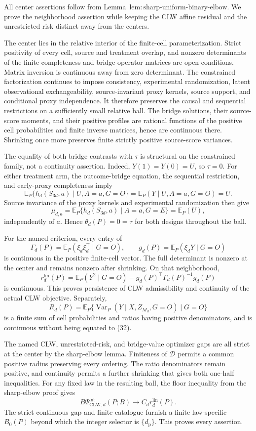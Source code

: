 All center assertions follow from Lemma~\(\mathrm{lem{:}sharp\text{-}uniform\text{-}binary\text{-}elbow}\). We prove the neighborhood assertion while keeping the CLW affine residual and the unrestricted risk distinct away from the centers.

The center lies in the relative interior of the finite-cell parameterization. Strict positivity of every cell, source and treatment overlap, and nonzero determinants of the finite completeness and bridge-operator matrices are open conditions. Matrix inversion is continuous away from zero determinant. The constrained factorization continues to impose consistency, experimental randomization, latent observational exchangeability, source-invariant proxy kernels, source support, and conditional proxy independence. It therefore preserves the causal and sequential restrictions on a sufficiently small relative ball. The bridge solutions, their source-score moments, and their positive profiles are rational functions of the positive cell probabilities and finite inverse matrices, hence are continuous there. Shrinking once more preserves finite strictly positive source-score variances.

The equality of both bridge contrasts with \(\tau\) is structural on the constrained family, not a continuity assertion. Indeed, \(Y(1)=Y(0)=U\), so \(\tau=0\). For either treatment arm, the outcome-bridge equation, the sequential restriction, and early-proxy completeness imply
\[
 \mathbb E_P\{h_d(S_{3d},a)\mid U,A=a,G=O\}
 =\mathbb E_P(Y\mid U,A=a,G=O)=U.
\]
Source invariance of the proxy kernels and experimental randomization then give
\[
 \mu_{d,a}
 =\mathbb E_P\{h_d(S_{3d},a)\mid A=a,G=E\}
 =\mathbb E_P(U),
\]
independently of \(a\). Hence \(\theta_d(P)=0=\tau\) for both designs throughout the ball.

For the named criterion, every entry of
\[
 \Gamma_d(P)=\mathbb E_P(\xi_d\xi_d^\top\mid G=O),
 \qquad g_d(P)=\mathbb E_P(\xi_dY\mid G=O)
\]
is continuous in the positive finite-cell vector. The full determinant is nonzero at the center and remains nonzero after shrinking. On that neighborhood,
\[
 r_d^{\mathrm{lin}}(P)
 =\mathbb E_P(Y^2\mid G=O)
 -g_d(P)^\top\Gamma_d(P)^{-1}g_d(P)                       \tag{32}
\]
is continuous. This proves persistence of CLW admissibility and continuity of the actual CLW objective. Separately,
\[
 R_d(P)=\mathbb E_P\{\operatorname{Var}_P(Y\mid X,Z_{M_d},G=O)\mid G=O\}
\]
is a finite sum of cell probabilities and ratios having positive denominators, and is continuous without being equated to (32).

The named CLW, unrestricted-risk, and bridge-value optimizer gaps are all strict at the center by the sharp-elbow lemma. Finiteness of \(\mathcal D\) permits a common positive radius preserving every ordering. The ratio denominators remain positive, and continuity permits a further shrinking that gives both one-half inequalities. For any fixed law in the resulting ball, the floor inequality from the sharp-elbow proof gives
\[
 B\Psi_{\mathrm{CLW},d}^{\mathrm{int}}(P;B)
 \longrightarrow C_dr_d^{\mathrm{lin}}(P).
\]
The strict continuous gap and finite catalogue furnish a finite law-specific \(B_0(P)\) beyond which the integer selector is \(\{d_{\mathrm p}\}\). This proves every assertion.